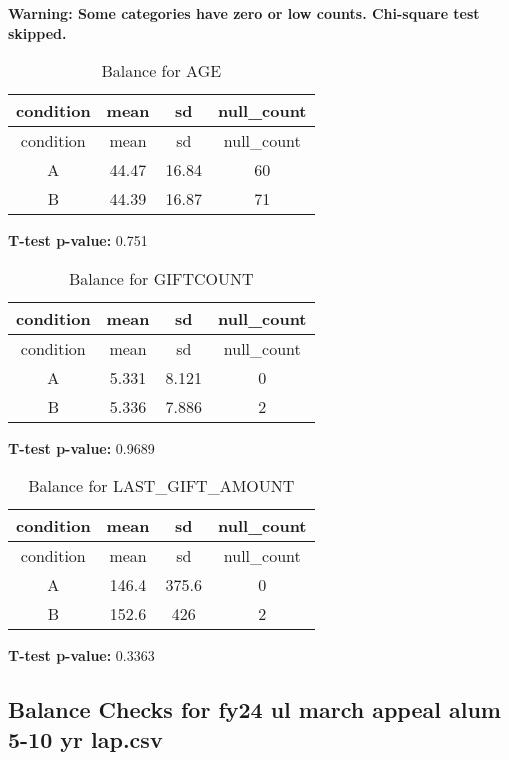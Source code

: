 \documentclass[
]{article}
\begin{document}
\textbf{Warning: Some categories have zero or low counts. Chi-square
test skipped.} \pagebreak

\begin{longtable}[]{@{}cccc@{}}
\caption{Balance for AGE}\tabularnewline
\toprule\noalign{}
condition & mean & sd & null\_count \\
\midrule\noalign{}
\endfirsthead
\toprule\noalign{}
condition & mean & sd & null\_count \\
\midrule\noalign{}
\endhead
\bottomrule\noalign{}
\endlastfoot
A & 44.47 & 16.84 & 60 \\
B & 44.39 & 16.87 & 71 \\
\end{longtable}

\textbf{T-test p-value:} 0.751\\
\pagebreak

\begin{longtable}[]{@{}cccc@{}}
\caption{Balance for GIFTCOUNT}\tabularnewline
\toprule\noalign{}
condition & mean & sd & null\_count \\
\midrule\noalign{}
\endfirsthead
\toprule\noalign{}
condition & mean & sd & null\_count \\
\midrule\noalign{}
\endhead
\bottomrule\noalign{}
\endlastfoot
A & 5.331 & 8.121 & 0 \\
B & 5.336 & 7.886 & 2 \\
\end{longtable}

\textbf{T-test p-value:} 0.9689\\
\pagebreak

\begin{longtable}[]{@{}cccc@{}}
\caption{Balance for LAST\_GIFT\_AMOUNT}\tabularnewline
\toprule\noalign{}
condition & mean & sd & null\_count \\
\midrule\noalign{}
\endfirsthead
\toprule\noalign{}
condition & mean & sd & null\_count \\
\midrule\noalign{}
\endhead
\bottomrule\noalign{}
\endlastfoot
A & 146.4 & 375.6 & 0 \\
B & 152.6 & 426 & 2 \\
\end{longtable}

\textbf{T-test p-value:} 0.3363\\
\pagebreak \clearpage

\subsection{Balance Checks for fy24 ul march appeal alum 5-10 yr
lap.csv}\label{balance-checks-for-fy24-ul-march-appeal-alum-5-10-yr-lap.csv}
\end{document}
